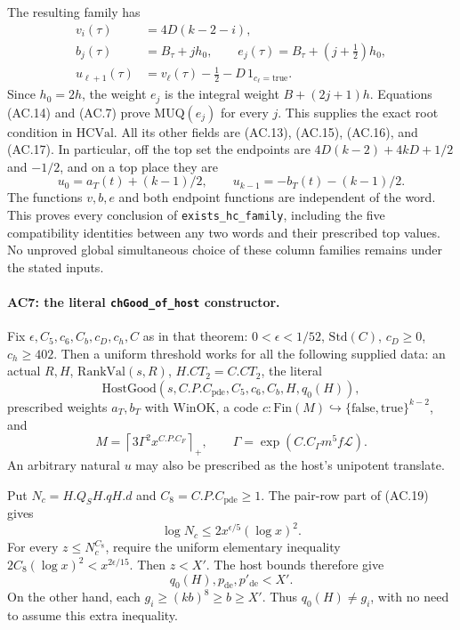 The resulting family has
\[
 \begin{split}
 v_i(\tau)&=4D(k-2-i),\\
 b_j(\tau)&=B_\tau+jh_0,\qquad
 e_j(\tau)=B_\tau+(j+\tfrac12)h_0,\\
 u_{\ell+1}(\tau)&=v_\ell(\tau)-\tfrac12
                         -D\,1_{c_\ell=\mathrm{true}}.
 \end{split}                                                 \tag{AC.17}
\]
Since $h_0=2h$, the weight $e_j$ is the integral weight $B+(2j+1)h$.
Equations (AC.14) and (AC.7) prove $\mathrm{MUQ}(e_j)$ for every $j$.
This supplies the exact root condition in $\mathrm{HCVal}$.
All its other fields are (AC.13), (AC.15), (AC.16), and (AC.17).
In particular, off the top set the endpoints are
$4D(k-2)+4kD+1/2$ and $-1/2$, and on a top place they are
\[
         u_0=a_T(t)+(k-1)/2,\qquad
         u_{k-1}=-b_T(t)-(k-1)/2.                            \tag{AC.18}
\]
The functions $v,b,e$ and both endpoint functions are independent
of the word. This proves every conclusion of
\texttt{exists\_hc\_family}, including the five compatibility
identities between any two words and their prescribed top values.
No unproved global simultaneous choice of these column families
remains under the stated inputs.

\paragraph{AC7: the literal \texttt{chGood\_of\_host} constructor.}
Fix $\epsilon,C_5,c_6,C_b,c_D,c_h,C$ as in that theorem:
$0<\epsilon<1/52$, $\mathrm{Std}(C)$, $c_D\geq0$, $c_h\geq402$.
Then a uniform threshold works for all the following supplied data:
an actual $R,H$, $\mathrm{RankVal}(s,R)$,
$H.CT_2=C.CT_2$, the literal
\[
 \mathrm{HostGood}(s,C.P.C_{\mathrm{pde}},C_5,c_6,C_b,
                                      H,q_0(H)),
                                                               \tag{AC.19}
\]
prescribed weights $a_T,b_T$ with $\mathrm{WinOK}$, a code
$c:\mathrm{Fin}(M)\hookrightarrow\{\mathrm{false},\mathrm{true}\}^{k-2}$,
and
\[
 M=\left\lceil3\Gamma^2x^{C.P.C_F}\right\rceil_+,
       \qquad \Gamma=\exp(C.C_\Gamma m^5f\mathcal L).
                                                               \tag{AC.20}
\]
An arbitrary natural $u$ may also be prescribed as the host's
unipotent translate.

Put $N_c=H.Q_S H.q H.d$ and $C_8=C.P.C_{\mathrm{pde}}\geq1$.
The pair-row part of (AC.19) gives
\[
              \log N_c\leq2x^{\epsilon/5}(\log x)^2.
\]
For every $z\leq N_c^{C_8}$, require the uniform elementary
inequality
$2C_8(\log x)^2< x^{2\epsilon/15}$.
Then $z<X'$. The host bounds therefore give
\[
                q_0(H),p_{\mathrm{de}},p'_{\mathrm{de}}<X'.
                                                               \tag{AC.21}
\]
On the other hand, each $g_i\geq(kb)^8\geq b\geq X'$.
Thus $q_0(H)\ne g_i$, with no need to assume this extra inequality.

